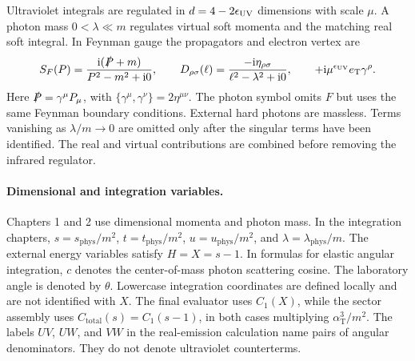 Ultraviolet integrals are regulated in $d=4-2\epsilon_{\rm UV}$
dimensions with scale $\mu$. A photon mass $0<\lambda\ll m$ regulates
virtual soft momenta and the matching real soft integral. In Feynman
gauge the propagators and electron vertex are
\begin{equation}
 S_F(P)=\frac{\mathrm{i}(\slashed P+m)}{P^2-m^2+\mathrm{i}0},\qquad
 D_{\rho\sigma}(\ell)=\frac{-\mathrm{i}\eta_{\rho\sigma}}
 {\ell^2-\lambda^2+\mathrm{i}0},\qquad
 +\mathrm{i}\mu^{\epsilon_{\rm UV}}e_{\mathrm T}\gamma^\rho.
\end{equation}
Here $\slashed P=\gamma^\mu P_\mu$, with
$\{\gamma^\mu,\gamma^\nu\}=2\eta^{\mu\nu}$.
The photon symbol omits $F$ but uses the same Feynman boundary
conditions. External hard photons are massless. Terms vanishing as
$\lambda/m\to0$ are omitted only after the singular terms have been
identified. The real and virtual contributions are combined before
removing the infrared regulator.

\paragraph{Dimensional and integration variables.} Chapters 1 and 2 use
dimensional momenta and photon mass. In the integration chapters,
$s=s_{\mathrm{phys}}/m^2$, $t=t_{\mathrm{phys}}/m^2$,
$u=u_{\mathrm{phys}}/m^2$, and $\lambda=\lambda_{\mathrm{phys}}/m$.
The external energy variables satisfy $H=X=s-1$. In formulas for
elastic angular integration, $c$ denotes the center-of-mass photon
scattering cosine. The laboratory angle is denoted by $\theta$. Lowercase integration
coordinates are defined locally and are not identified with $X$.
The final evaluator uses $C_1(X)$, while the sector assembly uses
$C_{\mathrm{total}}(s)=C_1(s-1)$, in both cases multiplying
$\alpha_{\mathrm T}^3/m^2$. The labels $UV$, $UW$, and $VW$ in the
real-emission calculation name pairs of angular denominators.
They do not denote ultraviolet counterterms.

